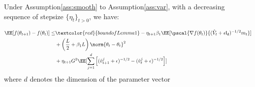 \documentclass[11pt]{article}
\begin{document}
\begin{Lemma}
Under Assumption\ref{ass:smooth} to Assumption\ref{ass:var}, with a decreasing sequence of stepsize $\{\eta_t\}_{t>0}$, we have:

\begin{equation}
\begin{split}
\EE[f(\theta_{t+1}) - f(\theta_{t}) ] \leq & \textcolor{red}{bound of Lemma1}- \eta_{t+1} \beta_1\EE[\pscal{\nabla f(\theta_t)}{(\hat{V}_{t} + \epsilon \mathsf{I_d})^{-1/2} m_{t}}]\\
& +  \left(\frac{L}{2} + \beta_1 L \right) \norm{\theta_t - \theta_{t}}^2\\
&+   \eta_{t+1} G^2 \EE[\sum_{j=1}^d \left[(\hat{v}^j_{t+1} + \epsilon )^{-1/2} - (\hat{v}^j_{t} + \epsilon )^{-1/2}  \right] ]
\end{split}
\end{equation}
where $d$ denotes the dimension of the parameter vector
\end{Lemma}
\end{document}
